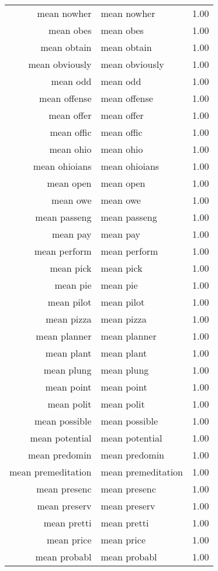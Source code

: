 \begin{table}[ht]
\begin{tabular}{rlr}
  mean nowher & mean nowher & 1.00 \\ 
  mean obes & mean obes & 1.00 \\ 
  mean obtain & mean obtain & 1.00 \\ 
  mean obviously & mean obviously & 1.00 \\ 
  mean odd & mean odd & 1.00 \\ 
  mean offense & mean offense & 1.00 \\ 
  mean offer & mean offer & 1.00 \\ 
  mean offic & mean offic & 1.00 \\ 
  mean ohio & mean ohio & 1.00 \\ 
  mean ohioians & mean ohioians & 1.00 \\ 
  mean open & mean open & 1.00 \\ 
  mean owe & mean owe & 1.00 \\ 
  mean passeng & mean passeng & 1.00 \\ 
  mean pay & mean pay & 1.00 \\ 
  mean perform & mean perform & 1.00 \\ 
  mean pick & mean pick & 1.00 \\ 
  mean pie & mean pie & 1.00 \\ 
  mean pilot & mean pilot & 1.00 \\ 
  mean pizza & mean pizza & 1.00 \\ 
  mean planner & mean planner & 1.00 \\ 
  mean plant & mean plant & 1.00 \\ 
  mean plung & mean plung & 1.00 \\ 
  mean point & mean point & 1.00 \\ 
  mean polit & mean polit & 1.00 \\ 
  mean possible & mean possible & 1.00 \\ 
  mean potential & mean potential & 1.00 \\ 
  mean predomin & mean predomin & 1.00 \\ 
  mean premeditation & mean premeditation & 1.00 \\ 
  mean presenc & mean presenc & 1.00 \\ 
  mean preserv & mean preserv & 1.00 \\ 
  mean pretti & mean pretti & 1.00 \\ 
  mean price & mean price & 1.00 \\ 
  mean probabl & mean probabl & 1.00 \\ 

\end{tabular}
\end{table}
